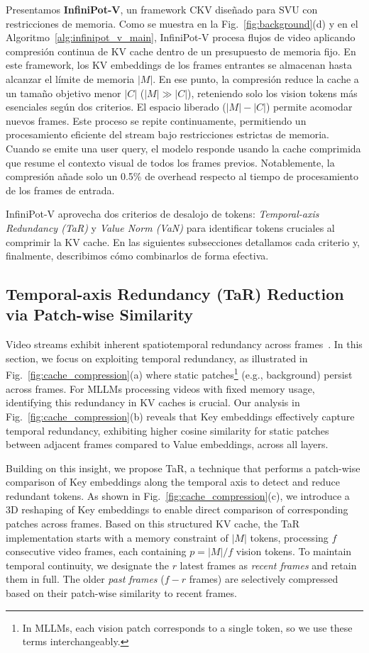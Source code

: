 Presentamos \textbf{InfiniPot-V}, un framework CKV diseñado para SVU con restricciones de memoria. Como se muestra en la Fig.~\ref{fig:background}(d) y en el Algoritmo~\ref{alg:infinipot_v_main}, InfiniPot-V procesa flujos de video aplicando compresión continua de KV cache dentro de un presupuesto de memoria fijo. 
En este framework, los KV embeddings de los frames entrantes se almacenan hasta alcanzar el límite de memoria $|M|$. En ese punto, la compresión reduce la cache a un tamaño objetivo menor $|C|$ ($|M| \gg |C|$), reteniendo solo los vision tokens más esenciales según dos criterios. El espacio liberado ($|M| - |C|$) permite acomodar nuevos frames. Este proceso se repite continuamente, permitiendo un procesamiento eficiente del stream bajo restricciones estrictas de memoria. Cuando se emite una user query, el modelo responde usando la cache comprimida que resume el contexto visual de todos los frames previos. Notablemente, la compresión añade solo un 0.5\% de overhead respecto al tiempo de procesamiento de los frames de entrada.

InfiniPot-V aprovecha dos criterios de desalojo de tokens: \textit{Temporal-axis Redundancy (TaR)} y \textit{Value Norm (VaN)} para identificar tokens cruciales al comprimir la KV cache. En las siguientes subsecciones detallamos cada criterio y, finalmente, describimos cómo combinarlos de forma efectiva.

\subsection{Temporal-axis Redundancy (TaR) Reduction via Patch-wise Similarity}\label{subsec:tar}

Video streams exhibit inherent spatiotemporal redundancy across frames~\cite{h264,shen2024longvu,tao2024dycokedynamiccompressiontokens}.
In this section, we focus on exploiting temporal redundancy, as illustrated in Fig.~\ref{fig:cache_compression}(a) where static patches\footnote{In MLLMs, each vision patch corresponds to a single token, so we use these terms interchangeably.} (e.g., background) persist across frames. For MLLMs processing videos with fixed memory usage, identifying this redundancy in KV caches is crucial. Our analysis in Fig.~\ref{fig:cache_compression}(b) reveals that Key embeddings effectively capture temporal redundancy, exhibiting higher cosine similarity for static patches between adjacent frames compared to Value embeddings, across all layers.

Building on this insight, we propose TaR, a technique that performs a patch-wise comparison of Key embeddings along the temporal axis to detect and reduce redundant tokens. As shown in Fig.~\ref{fig:cache_compression}(c), we introduce a 3D reshaping of Key embeddings to enable direct comparison of corresponding patches across frames. Based on this structured KV cache, the TaR implementation starts with a memory constraint of $|M|$ tokens, processing $f$ consecutive video frames, each containing $p = |M|/f$ vision tokens. To maintain temporal continuity, we designate the $r$ latest frames as \textit{recent frames} and retain them in full. The older \textit{past frames} ($f-r$ frames) are selectively compressed based on their patch-wise similarity to recent frames.

